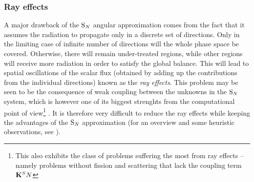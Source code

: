 \subsubsection{Ray effects}
A major drawback of the $\text{S}_{N}$ angular approximation comes from the fact that it assumes the radiation to propagate only
in a discrete set of directions. Only in the limiting case of infinite number of directions will the whole phase space
be covered. Otherwise, there will remain under-treated regions, while other regions will receive more radiation in order
to satisfy the global balance. This will lead to spatial oscillations of the scalar flux (obtained by adding up the
contributions from the individual directions) known as the \textit{ray effects}. This problem may be seen to be the
consequence of weak coupling between the unknowns in the $\text{S}_{N}$ system, which is however one of its biggest strenghts
from the computational point of view\footnote{This also exhibits the class of problems suffering the most from ray
effects -- namely problems without fission and scattering that lack the coupling term $\mathbf{K}^SN$} .
It is therefore very difficult to reduce the ray effects while keeping the advantages of the $\text{S}_{N}$ approximation (for an
overview and some heuristic observations, see \cite{Li1}). 


